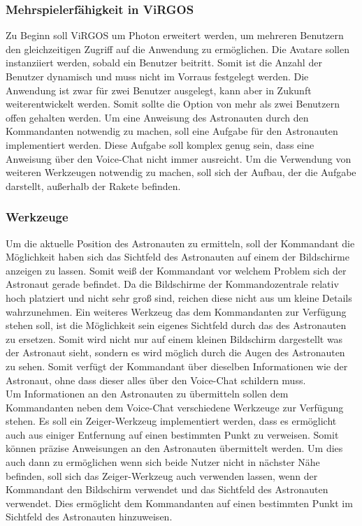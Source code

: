 \subsubsection{Mehrspielerfähigkeit in ViRGOS}
Zu Beginn soll ViRGOS um Photon erweitert werden, um mehreren Benutzern den gleichzeitigen Zugriff auf die Anwendung zu ermöglichen. Die Avatare sollen instanziiert werden, sobald ein Benutzer beitritt. Somit ist die Anzahl der Benutzer dynamisch und muss nicht im Vorraus festgelegt werden. Die Anwendung ist zwar für zwei Benutzer ausgelegt, kann aber in Zukunft weiterentwickelt werden. Somit sollte die Option von mehr als zwei Benutzern offen gehalten werden. Um eine Anweisung des Astronauten durch den Kommandanten notwendig zu machen, soll eine Aufgabe für den Astronauten implementiert werden. Diese Aufgabe soll komplex genug sein, dass eine Anweisung über den Voice-Chat nicht immer ausreicht. Um die Verwendung von weiteren Werkzeugen notwendig zu machen, soll sich der Aufbau, der die Aufgabe darstellt, außerhalb der Rakete befinden. 

\subsubsection{Werkzeuge}
Um die aktuelle Position des Astronauten zu ermitteln, soll der Kommandant die Möglichkeit haben sich das Sichtfeld des Astronauten auf einem der Bildschirme anzeigen zu lassen. Somit weiß der Kommandant vor welchem Problem sich der Astronaut gerade befindet. Da die Bildschirme der Kommandozentrale relativ hoch platziert und nicht sehr groß sind, reichen diese nicht aus um kleine Details wahrzunehmen. Ein weiteres Werkzeug das dem Kommandanten zur Verfügung stehen soll, ist die Möglichkeit sein eigenes Sichtfeld durch das des Astronauten zu ersetzen. Somit wird nicht nur auf einem kleinen Bildschirm dargestellt was der Astronaut sieht, sondern es wird möglich durch die Augen des Astronauten zu sehen. Somit verfügt der Kommandant über dieselben Informationen wie der Astronaut, ohne dass dieser alles über den Voice-Chat schildern muss. \\

\noindent Um Informationen an den Astronauten zu übermitteln sollen dem Kommandanten neben dem Voice-Chat verschiedene Werkzeuge zur Verfügung stehen. Es soll ein Zeiger-Werkzeug implementiert werden, dass es ermöglicht auch aus einiger Entfernung auf einen bestimmten Punkt zu verweisen. Somit können präzise Anweisungen an den Astronauten übermittelt werden. Um dies auch dann zu ermöglichen wenn sich beide Nutzer nicht in nächster Nähe befinden, soll sich das Zeiger-Werkzeug auch verwenden lassen, wenn der Kommandant den Bildschirm verwendet und das Sichtfeld des Astronauten verwendet. Dies ermöglicht dem Kommandanten auf einen bestimmten Punkt im Sichtfeld des Astronauten hinzuweisen. \newline

